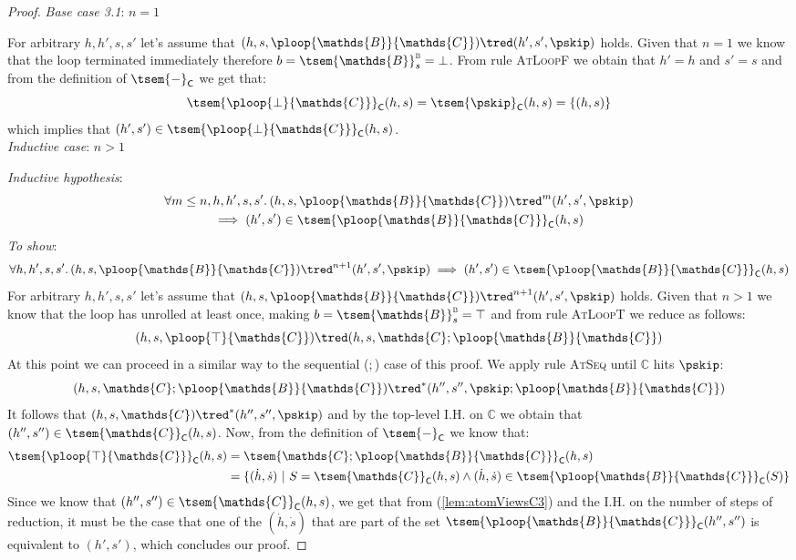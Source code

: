 \begin{lem}
{\begin{proof}
	\textit{Base case 3.1}: $n = 1$
	
	For arbitrary $h, h', s, s'$ let's assume that $(h, s, \ploop{\mathds{B}}{\mathds{C}}) \tred (h', s', \pskip)$ holds. Given that $n=1$ we know that the loop terminated immediately therefore $b = \tsem{\mathds{B}}^\textsc{b}_s = \bot$.  From rule \textsc{AtLoopF} we obtain that $h' = h$ and $s' = s$ and from the definition of $\tsem{-}_\mathsf{C}$ we get that:
	\[
		\tsem{\ploop{\bot}{\mathds{C}}}_\mathsf{C}(h, s) = \tsem{\pskip}_\mathsf{C}(h,s) = \{(h, s)\}
	\]
	which implies that $(h', s') \in \tsem{\ploop{\bot}{\mathds{C}}}_\mathsf{C}(h, s)$. \\
	
	\textit{Inductive case}: $n > 1$
	
	\textit{Inductive hypothesis}:
	\begin{gather*}
		\forall m \leq n, h, h', s, s' \ldotp
		(h, s, \ploop{\mathds{B}}{\mathds{C}}) \tred^m (h', s', \pskip) \\
		\implies
		(h', s') \in \tsem{\ploop{\mathds{B}}{\mathds{C}}}_\mathsf{C}(h, s)
	\end{gather*}
	\textit{To show}:
	\[
		\forall h, h', s, s' \ldotp
		(h, s, \ploop{\mathds{B}}{\mathds{C}}) \tred^{n+1} (h', s', \pskip)
		\implies
		(h', s') \in \tsem{\ploop{\mathds{B}}{\mathds{C}}}_\mathsf{C}(h, s)
	\]
	For arbitrary $h, h', s, s'$ let's assume that $(h, s, \ploop{\mathds{B}}{\mathds{C}}) \tred^{n+1} (h', s', \pskip)$ holds. Given that $n>1$ we know that the loop has unrolled at least once, making $b = \tsem{\mathds{B}}^\textsc{b}_s = \top$ and from rule \textsc{AtLoopT} we reduce as follows:
	\[
		(h, s, \ploop{\top}{\mathds{C}}) \tred (h, s, \mathds{C} ; \ploop{\mathds{B}}{\mathds{C}})
	\]
	At this point we can proceed in a similar way to the sequential ($;$) case of this proof. We apply rule \textsc{AtSeq} until $\mathds{C}$ hits $\pskip$:
	\[
		(h, s, \mathds{C} ; \ploop{\mathds{B}}{\mathds{C}})
			\tred^*
		(h'', s'', \pskip ; \ploop{\mathds{B}}{\mathds{C}})
	\]
	It follows that $(h, s, \mathds{C}) \tred^* (h'', s'', \pskip)$ and by the top-level I.H. on $\mathds{C}$ we obtain that $(h'', s'') \in \tsem{\mathds{C}}_\mathsf{C}(h, s)$. Now, from the definition of $\tsem{-}_\mathsf{C}$ we know that:
	\begin{align}
		\tsem{\ploop{\top}{\mathds{C}}}_\mathsf{C}(h, s)
		&= \tsem{\mathds{C} ; \ploop{\mathds{B}}{\mathds{C}}}_\mathsf{C}(h,s) \\
		\label{lem:atomViewsC4}
		&= \{ (\dot{h}, \dot{s})\ |\ S = \tsem{\mathds{C}}_\mathsf{C}(h,s) \land (\dot{h}, \dot{s}) \in  \tsem{\ploop{\mathds{B}}{\mathds{C}}}_\mathsf{C}(S)\}
	\end{align}
	Since we know that $(h'', s'') \in \tsem{\mathds{C}}_\mathsf{C}(h, s)$, we get that from (\ref{lem:atomViewsC3}) and the I.H. on the number of steps of reduction, it must be the case that one of the $(\dot{h}, \dot{s})$ that are part of the set $\tsem{\ploop{\mathds{B}}{\mathds{C}}}_\mathsf{C}(h'', s'')$ is equivalent to $(h', s')$, which concludes our proof.
	\end{proof}
	}
\end{lem}

